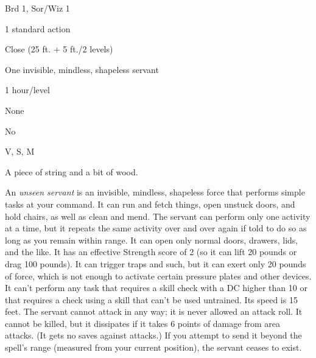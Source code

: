 
\begin{description*}
\item[Level:] Brd 1, Sor/Wiz 1
\item[Casting Time:] 1 standard action
\item[Range:] Close (25 ft. + 5 ft./2 levels)
\item[Effect:] One invisible, mindless, shapeless servant
\item[Duration:] 1 hour/level
\item[Saving Throw:] None
\item[Spell Resistance:] No
\item[Components:] V, S, M
\item[Arcane Material Component:] A piece of string and a bit of wood.
\end{description*}

An \textit{unseen servant} is an invisible, mindless, shapeless force that performs
simple tasks at your command. It can run and fetch things, open unstuck doors,
and hold chairs, as well as clean and mend. The servant can perform only one activity
at a time, but it repeats the same activity over and over again if told to do so
as long as you remain within range. It can open only normal doors, drawers, lids,
and the like. It has an effective Strength score of 2 (so it can lift 20 pounds
or drag 100 pounds). It can trigger traps and such, but it can exert only 20 pounds
of force, which is not enough to activate certain pressure plates and other devices.
It can't perform any task that requires a skill check with a DC higher than 10
or that requires a check using a skill that can't be used untrained. Its speed
is 15 feet.
The servant cannot attack in any way; it is never allowed an attack roll. It cannot
be killed, but it dissipates if it takes 6 points of damage from area attacks.
(It gets no saves against attacks.) If you attempt to send it beyond the spell's
range (measured from your current position), the servant ceases to exist.